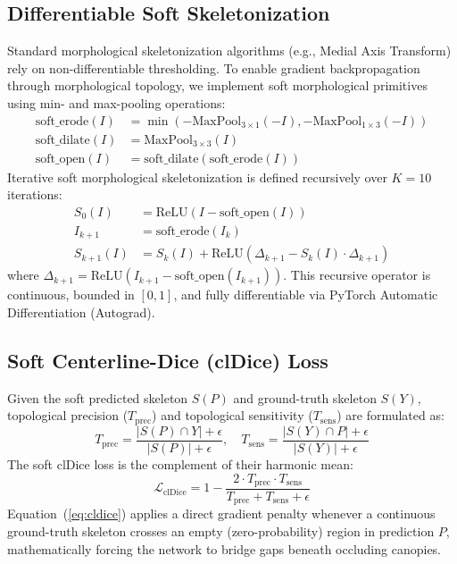 \documentclass[conference]{IEEEtran}
\begin{document}
\subsection{Differentiable Soft Skeletonization}
Standard morphological skeletonization algorithms (e.g., Medial Axis Transform) rely on non-differentiable thresholding. To enable gradient backpropagation through morphological topology, we implement soft morphological primitives~\cite{shit2021cldice} using min- and max-pooling operations:
\begin{align}
    \text{soft\_erode}(I) &= \min\left( -\text{MaxPool}_{3\times1}(-I), -\text{MaxPool}_{1\times3}(-I) \right) \\
    \text{soft\_dilate}(I) &= \text{MaxPool}_{3\times3}(I) \\
    \text{soft\_open}(I) &= \text{soft\_dilate}\left(\text{soft\_erode}(I)\right)
\end{align}
Iterative soft morphological skeletonization is defined recursively over $K=10$ iterations:
\begin{align}
    S_0(I) &= \text{ReLU}\left(I - \text{soft\_open}(I)\right) \\
    I_{k+1} &= \text{soft\_erode}(I_k) \\
    S_{k+1}(I) &= S_k(I) + \text{ReLU}\left(\Delta_{k+1} - S_k(I) \cdot \Delta_{k+1}\right)
\end{align}
where $\Delta_{k+1} = \text{ReLU}\left(I_{k+1} - \text{soft\_open}(I_{k+1})\right)$. This recursive operator is continuous, bounded in $[0, 1]$, and fully differentiable via PyTorch Automatic Differentiation (Autograd).

\subsection{Soft Centerline-Dice (clDice) Loss}
Given the soft predicted skeleton $S(P)$ and ground-truth skeleton $S(Y)$, topological precision ($T_{\text{prec}}$) and topological sensitivity ($T_{\text{sens}}$) are formulated as:
\begin{equation}
    T_{\text{prec}} = \frac{|S(P) \cap Y| + \epsilon}{|S(P)| + \epsilon}, \quad T_{\text{sens}} = \frac{|S(Y) \cap P| + \epsilon}{|S(Y)| + \epsilon}
\end{equation}
The soft clDice loss is the complement of their harmonic mean:
\begin{equation}
    \mathcal{L}_{\text{clDice}} = 1 - \frac{2 \cdot T_{\text{prec}} \cdot T_{\text{sens}}}{T_{\text{prec}} + T_{\text{sens}} + \epsilon}
    \label{eq:cldice}
\end{equation}
Equation~(\ref{eq:cldice}) applies a direct gradient penalty whenever a continuous ground-truth skeleton crosses an empty (zero-probability) region in prediction $P$, mathematically forcing the network to bridge gaps beneath occluding canopies.
\end{document}
